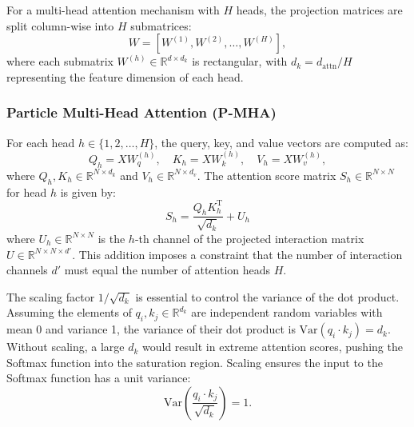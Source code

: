 \documentclass[12pt]{article}
\begin{document}
            For a multi-head attention mechanism with $H$ heads, the projection matrices are split column-wise into $H$ submatrices:
            \begin{equation}
                W = \left[ W^{(1)}, W^{(2)}, \dots, W^{(H)} \right],
            \end{equation}
            where each submatrix $W^{(h)} \in \mathbb{R}^{d \times d_k}$ is rectangular, with $d_k = d_{\text{attn}}/H$ representing the feature dimension of each head.

        \subsubsection{Particle Multi-Head Attention (P-MHA)}

            For each head $h \in \{1, 2, \dots, H\}$, the query, key, and value vectors are computed as:
            \begin{equation}
                Q_h = X W_q^{(h)}, \quad K_h = X W_k^{(h)}, \quad V_h = X W_v^{(h)},
            \end{equation}
            where $Q_h, K_h \in \mathbb{R}^{N \times d_k}$ and $V_h \in \mathbb{R}^{N \times d_v}$. The attention score matrix $S_h \in \mathbb{R}^{N \times N}$ for head $h$ is given by:
            \begin{equation}
                \label{eq:p_mha_score}
                S_h = \frac{Q_h K_h^{\text{T}}}{\sqrt{d_k}} + U_h
            \end{equation}
            where $U_h \in \mathbb{R}^{N \times N}$ is the $h$-th channel of the projected interaction matrix $U \in \mathbb{R}^{N \times N \times d'}$. This addition imposes a constraint that the number of interaction channels $d'$ must equal the number of attention heads $H$.
            
            The scaling factor $1/\sqrt{d_k}$ is essential to control the variance of the dot product. Assuming the elements of $q_i, k_j \in \mathbb{R}^{d_k}$ are independent random variables with mean 0 and variance 1, the variance of their dot product is $\text{Var}(q_i \cdot k_j) = d_k$. Without scaling, a large $d_k$ would result in extreme attention scores, pushing the Softmax function into the saturation region. Scaling ensures the input to the Softmax function has a unit variance:
            \begin{equation}
                \text{Var}\left( \frac{q_i \cdot k_j}{\sqrt{d_k}} \right) = 1.
            \end{equation}
            
\end{document}
